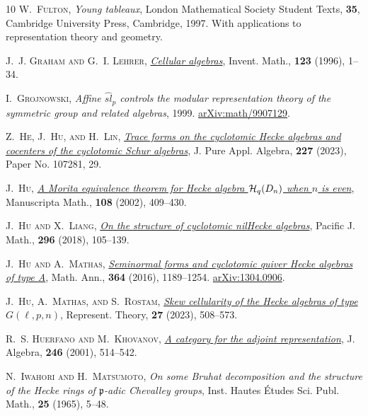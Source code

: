 \documentclass[a4paper,11pt]{amsart}
\numberwithin{equation}{subsection}
\theoremstyle{definition}
\theoremstyle{theorem}
\theoremstyle{remark}
\begin{document}
\begin{thebibliography}{10}
\textsc{W.~Fulton}, \textit{Young tableaux}, London Mathematical Society
  Student Texts, \textbf{35}, Cambridge University Press, Cambridge, 1997.
\newblock With applications to representation theory and geometry.

\textsc{J.~J. Graham and G.~I. Lehrer},
  \href{http://dx.doi.org/10.1007/BF01232365}{\textit{Cellular algebras}},
  Invent. Math., \textbf{123} (1996), 1--34.

\textsc{I.~Grojnowski}, \textit{Affine $\widehat{sl}_p$ controls the modular
  representation theory of the symmetric group and related algebras}, 1999.
\newblock \href{http://arxiv.org/abs/math/9907129}{arXiv:math/9907129}.

\textsc{Z.~He, J.~Hu, and H.~Lin},
  \href{http://dx.doi.org/10.1016/j.jpaa.2022.107281}{\textit{Trace forms on
  the cyclotomic {H}ecke algebras and cocenters of the cyclotomic {S}chur
  algebras}}, J. Pure Appl. Algebra, \textbf{227} (2023), Paper No. 107281, 29.

\textsc{J.~Hu}, \href{http://dx.doi.org/10.1007/s002290200272}{\textit{A
  {M}orita equivalence theorem for {H}ecke algebra {${\mathcal H}\sb q(D\sb
  n)$} when {$n$} is even}}, Manuscripta Math., \textbf{108} (2002), 409--430.

\textsc{J.~Hu and X.~Liang},
  \href{http://dx.doi.org/10.2140/pjm.2018.296.105}{\textit{On the structure of
  cyclotomic nil{H}ecke algebras}}, Pacific J. Math., \textbf{296} (2018),
  105--139.

\textsc{J.~Hu and A.~Mathas},
  \href{http://dx.doi.org/10.1007/s00208-015-1242-8}{\textit{Seminormal forms
  and cyclotomic quiver {H}ecke algebras of type {A}}}, Math. Ann.,
  \textbf{364} (2016), 1189--1254.
\newblock \href{http://arxiv.org/abs/1304.0906}{arXiv:1304.0906}.

\textsc{J.~Hu, A.~Mathas, and S.~Rostam},
  \href{http://dx.doi.org/10.1090/ert/646}{\textit{Skew cellularity of the
  {H}ecke algebras of type {$G(\ell,p,n)$}}}, Represent. Theory, \textbf{27}
  (2023), 508--573.

\textsc{R.~S. Huerfano and M.~Khovanov},
  \href{http://dx.doi.org/10.1006/jabr.2001.8962}{\textit{A category for the
  adjoint representation}}, J. Algebra, \textbf{246} (2001), 514--542.

\textsc{N.~Iwahori and H.~Matsumoto}, \textit{On some {B}ruhat decomposition
  and the structure of the {H}ecke rings of {${\mathfrak p}$}-adic {C}hevalley
  groups}, Inst. Hautes \'Etudes Sci. Publ. Math., \textbf{25} (1965), 5--48.


\end{thebibliography}
\end{document}
